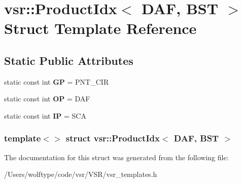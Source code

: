 \hypertarget{structvsr_1_1_product_idx_3_01_d_a_f_00_01_b_s_t_01_4}{\section{vsr\-:\-:Product\-Idx$<$ D\-A\-F, B\-S\-T $>$ Struct Template Reference}
\label{structvsr_1_1_product_idx_3_01_d_a_f_00_01_b_s_t_01_4}
}
\subsection*{Static Public Attributes}
\begin{DoxyCompactItemize}
\item 
\hypertarget{structvsr_1_1_product_idx_3_01_d_a_f_00_01_b_s_t_01_4_a8225d7620f82bc2cc5763336e8b170e3}{static const int {\bfseries G\-P} = P\-N\-T\-\_\-\-C\-I\-R}\label{structvsr_1_1_product_idx_3_01_d_a_f_00_01_b_s_t_01_4_a8225d7620f82bc2cc5763336e8b170e3}

\item 
\hypertarget{structvsr_1_1_product_idx_3_01_d_a_f_00_01_b_s_t_01_4_a67327a621cead743fbd4fd52e9232047}{static const int {\bfseries O\-P} = D\-A\-F}\label{structvsr_1_1_product_idx_3_01_d_a_f_00_01_b_s_t_01_4_a67327a621cead743fbd4fd52e9232047}

\item 
\hypertarget{structvsr_1_1_product_idx_3_01_d_a_f_00_01_b_s_t_01_4_a26949b406982cd84894444a55eaff9fd}{static const int {\bfseries I\-P} = S\-C\-A}\label{structvsr_1_1_product_idx_3_01_d_a_f_00_01_b_s_t_01_4_a26949b406982cd84894444a55eaff9fd}

\end{DoxyCompactItemize}
\subsubsection*{template$<$$>$ struct vsr\-::\-Product\-Idx$<$ D\-A\-F, B\-S\-T $>$}



The documentation for this struct was generated from the following file\-:\begin{DoxyCompactItemize}
\item 
/\-Users/wolftype/code/vsr/\-V\-S\-R/vsr\-\_\-templates.\-h\end{DoxyCompactItemize}
